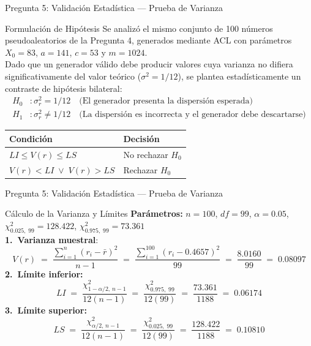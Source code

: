 \documentclass[aspectratio=169, 10pt]{beamer}
\begin{document}
\begin{frame}{Pregunta 5: Validación Estadística — Prueba de Varianza}
	\begin{exampleblock}{Formulación de Hipótesis}
		\justifying
		Se analizó el mismo conjunto de 100 números pseudoaleatorios de la Pregunta 4,
		generados mediante ACL con parámetros $X_0 = 83$, $a = 141$, $c = 53$ y $m = 1024$.\\[6pt]
		Dado que un generador válido debe producir valores cuya varianza no
		difiera significativamente del valor teórico ($\sigma^2 = 1/12$),
		se plantea estadísticamente un contraste de hipótesis bilateral:
		\begin{align*}
			H_0 & : \sigma_r^2 = 1/12
			\quad \text{(El generador presenta la dispersión esperada)} \\[6pt]
			H_1 & : \sigma_r^2 \neq 1/12
			\quad \text{(La dispersión es incorrecta y el generador debe descartarse)}
		\end{align*}
		\begin{center}
			\small
			\renewcommand{\arraystretch}{1.3}
			\setlength{\tabcolsep}{12pt}
			\begin{tabular}{ll}
				\toprule
				\textbf{Condición}             & \textbf{Decisión} \\
				\midrule
				$LI \leq V(r) \leq LS$         & No rechazar $H_0$ \\
				$V(r) < LI \;\lor\; V(r) > LS$ & Rechazar $H_0$    \\
				\bottomrule
			\end{tabular}
		\end{center}
	\end{exampleblock}
\end{frame}

\begin{frame}{Pregunta 5: Validación Estadística — Prueba de Varianza}
	\begin{exampleblock}{Cálculo de la Varianza y Límites}
		\textbf{Parámetros:} $n = 100$,\; $df = 99$,\; $\alpha = 0.05$,\;
		$\chi^2_{0.025,\;99} = 128.422$,\; $\chi^2_{0.975,\;99} = 73.361$ \\[6pt]
		\textbf{1.\ Varianza muestral}:\\[-6pt]
		\[
			V(r) \;=\;
			\frac{\displaystyle\sum_{i=1}^{n}(r_i - \bar{r})^2}{n-1}
			\;=\; \frac{\displaystyle\sum_{i=1}^{100}(r_i - 0.4657)^2}{99}
			\;=\;
			\frac{8.0160}{99}
			\;=\; \mathbf{0.08097}
		\]
		\vspace{6pt}
		\textbf{2.\ Límite inferior:}\\[-10pt]
		\[
			LI \;=\; \frac{\chi^2_{1-\alpha/2,\,n-1}}{12(n-1)}
			\;=\; \frac{\chi^2_{0.975,\;99}}{12(99)}
			\;=\; \frac{73.361}{1188}
			\;=\; \mathbf{0.06174}
		\]
		\vspace{6pt}
		\textbf{3.\ Límite superior:}\\[-10pt]
		\[
			LS \;=\; \frac{\chi^2_{\alpha/2,\,n-1}}{12(n-1)}
			\;=\; \frac{\chi^2_{0.025,\;99}}{12(99)}
			\;=\; \frac{128.422}{1188}
			\;=\; \mathbf{0.10810}
		\]
		\vspace{-6pt}
	\end{exampleblock}
\end{frame}
\end{document}
